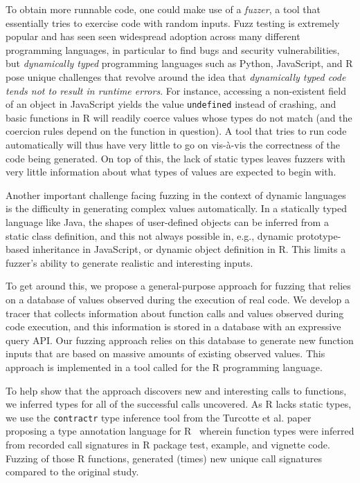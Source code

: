 \documentclass[sigplan,anonymous,review]{acmart}
\begin{document}
To obtain more runnable code, one could make use of a \textit{fuzzer}, a tool that essentially tries to exercise code with random inputs. 
Fuzz testing is extremely popular and has seen seen widespread adoption across many different programming languages, in particular to find bugs and security vulnerabilities, but \textit{dynamically typed} programming languages such as Python, JavaScript, and R pose unique challenges that revolve around the idea that \textit{dynamically typed code tends not to result in runtime errors}.
For instance, accessing a non-existent field of an object in JavaScript yields the value {\tt undefined} instead of crashing, and basic functions in R will readily coerce values whose types do not match (and the coercion rules depend on the function in question).
A tool that tries to run code automatically will thus have very little to go on vis-\`a-vis the correctness of the code being generated.
On top of this, the lack of static types leaves fuzzers with very little information about what types of values are expected to begin with.

Another important challenge facing fuzzing in the context of dynamic languages is the difficulty in generating complex values automatically.
In a statically typed language like Java, the shapes of user-defined objects can be inferred from a static class definition, and this not always possible in, e.g., dynamic prototype-based inheritance in JavaScript, or dynamic object definition in R.
This limits a fuzzer's ability to generate realistic and interesting inputs.

To get around this, we propose a general-purpose approach for fuzzing that relies on a database of values observed during the execution of real code.
We develop a tracer that collects information about function calls and values observed during code execution, and this information is stored in a database with an expressive query API.
Our fuzzing approach relies on this database to generate new function inputs that are based on massive amounts of existing observed values.
This approach is implemented in a tool called \tool for the R programming language.

To help show that the approach discovers new and interesting calls to functions, we inferred types for all of the successful calls \tool uncovered.
As R lacks static types, we use the {\tt contractr} type inference tool from the Turcotte et al. paper proposing a type annotation language for R~\cite{turcotte2020designing} wherein function types were inferred from recorded call signatures in R package test, example, and vignette code.
Fuzzing \UFNumFunctions of those R functions, \tool generated \UFSignatrSignaturesRnd (\UFSignatrBaselineSignaturesRatio times) new unique call signatures compared to the original study.
\end{document}
